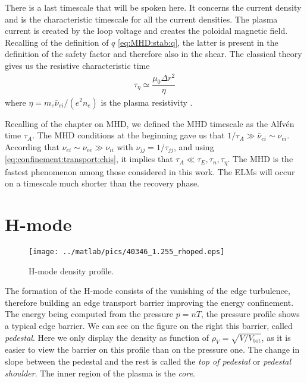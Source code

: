 There is a last timescale that will be spoken here. It concerns the current density and is the characteristic timescale for all the current densities. The plasma current is created by the loop voltage and creates the poloidal magnetic field. Recalling of the definition of $q$ \eqref{eq:MHD:stab:q}, the latter is present in the definition of the safety factor and therefore also in the shear. The classical theory gives us the resistive characteristic time \cite{boyd-sanderson}
\begin{align}\label{eq:confinement:transport:taus:taueta}
	\tau_{\eta} \simeq \dfrac{ \mu_0 \Delta r^2}{\eta}
\end{align}
where $\eta = m_e \bar{\nu}_{ei} / ( e^2 n_e )$ is the plasma resistivity \cite{freidberg}.

Recalling of the chapter on MHD, we defined the MHD timescale as the Alfv\'en time $\tau_A$. The MHD conditions at the beginning gave us that $1 / \tau_A \gg \bar{\nu}_{ei} \sim \nu_{ei}$. According that $\nu_{ei} \sim \nu_{ee} \gg \nu_{ii}$ \cite{freidberg} with $\nu_{jj} = 1 / \tau_{jj}$, and using \eqref{eq:confinement:transport:chis}, it implies that $\tau_A \ll \tau_E, \tau_n, \tau_{\eta}$. The MHD is the fastest phenomenon among those considered in this work. The ELMs will occur on a timescale much shorter than the recovery phase.
\section{H-mode}\label{sec:confinement:Hmode}
\begin{wrapfigure}{r}{5cm}
\vspace{-0.5cm}
\texttt{[image: ../matlab/pics/40346\_1.255\_rhoped.eps]}
\vspace{-0.5cm}
\caption{\footnotesize H-mode density profile.}
\vspace{-0.5cm}
\end{wrapfigure}
The formation of the H-mode consists of the vanishing of the edge turbulence, therefore building an edge transport barrier improving the energy confinement. The energy being computed from the pressure $p = nT$, the pressure profile shows a typical edge barrier. We can see on the figure on the right this barrier, called \emph{pedestal}. Here we only display the density as function of $\rho_V = \sqrt{ V / V_{\textrm{tot}} }$, as it is easier to view the barrier on this profile than on the pressure one. The change in slope between the pedestal and the rest is called the \emph{top of pedestal} or \emph{pedestal shoulder}. The inner region of the plasma is the \emph{core}.

